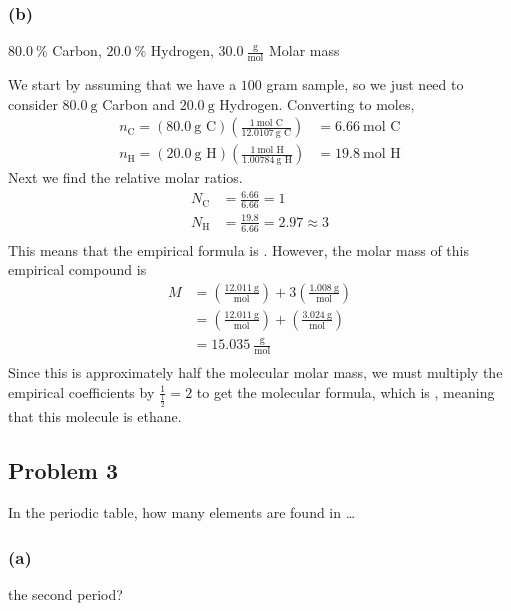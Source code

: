 \documentclass[11pt]{scrartcl}
\begin{document}
\subsubsection{(b)}
$80.0\ \%$ Carbon, $20.0\ \%$ Hydrogen, $30.0\ \frac{\text{g}}{\text{mol}}$ Molar mass

We start by assuming that we have a $100$ gram sample, so we just need to consider $80.0\ \text{g}$ Carbon and $20.0\ \text{g}$ Hydrogen.
Converting to moles,
\begin{align*}
    n_{\text{C}} = \left ( 80.0\ \text{g C} \right) \left (\frac{1\ \text{mol C}}{12.0107\ \text{g C}} \right) &= 6.66\ \text{mol C} \\
    n_{\text{H}} = \left (20.0\ \text{g H} \right ) \left ( \frac{1\ \text{mol H}}{1.00784\ \text{g H}} \right) &= 19.8\ \text{mol H}
\end{align*}
Next we find the relative molar ratios.
\begin{align*}
    N_\text{C} &= \frac{6.66}{6.66} = 1 \\
    N_{\text{H}} &= \frac{19.8}{6.66} = 2.97 \approx 3 \\
\end{align*}
This means that the empirical formula is .
However, the molar mass of this empirical compound is
\begin{align*}
    M &= \left ( \frac{12.011\ \text{g} }{\text{mol}} \right) + 3 \left ( \frac{1.008\ \text{g}}{\text{mol}} \right) \\
    &= \left ( \frac{12.011\ \text{g} }{\text{mol}} \right) + \left ( \frac{3.024\ \text{g}}{\text{mol}} \right) \\
    &= 15.035\ \frac{ \text{g}}{\text{mol}} \\
\end{align*}
Since this is approximately half the molecular molar mass, we must multiply the empirical coefficients by $\frac{1}{\frac{1}{2}} = 2$ to get the molecular formula, which is , meaning that this molecule is ethane.

\newpage
\subsection{Problem 3}
In the periodic table, how many elements are found in \dots

\subsubsection{(a)}
the second period?
\end{document}
